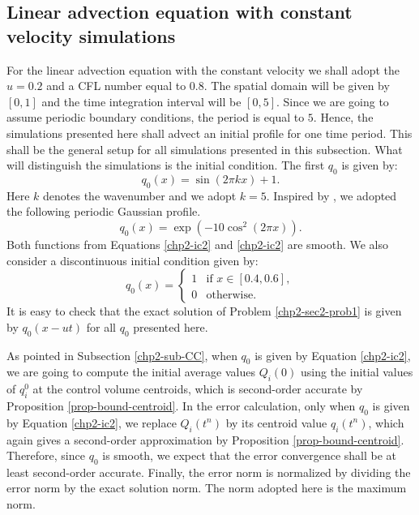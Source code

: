 \subsection{Linear advection equation with constant velocity simulations}
\label{chp2-sec-numerical-exp-1}

For the linear advection equation with the constant velocity we shall adopt the $u=0.2$ and 
a CFL number equal to $0.8$.
The spatial domain will be given by $[0,1]$ and the time integration interval will be $[0,5]$.
Since we are going to assume periodic boundary conditions, the period is equal to $5$. 
Hence, the simulations presented here shall advect an initial profile for one time period. 
This shall be the general setup for all simulations presented in this subsection. 
What will distinguish the simulations is the initial condition.
The first $q_0$ is given by:
\begin{equation}
	\label{chp2-ic1}
	q_0(x) = \sin (2\pi k x) + 1.
\end{equation}
Here $k$ denotes the wavenumber and we adopt $k=5$.
Inspired by \citet{trefethen:2000}, we adopted the following periodic Gaussian profile.
\begin{equation}
	\label{chp2-ic2}
		q_0(x) = \exp(-10\cos^2 (2\pi x)).
\end{equation}
Both functions from Equations \eqref{chp2-ic2} and \eqref{chp2-ic2} are smooth.
We also consider a discontinuous initial condition given by:
\begin{equation}
	\label{chp2-ic3}
		q_0(x) =  
  \begin{cases}
		1 & \text{if } x \in [0.4,0.6],\\
		0 & \text{otherwise}.
  \end{cases}
\end{equation}
It is easy to check that the  exact solution of Problem \ref{chp2-sec2-prob1}
is given by $q_0(x-ut)$ for all $q_0$ presented here.

As pointed in Subsection \ref{chp2-sub-CC}, when $q_0$ is given by Equation \eqref{chp2-ic2},
we are going to compute the initial average values $Q_i(0)$ using
the initial values of $q^0_i$ at the control volume centroids, which is second-order 
accurate by Proposition \ref{prop-bound-centroid}.
In the error calculation, only when $q_0$ is given by Equation \eqref{chp2-ic2},
we replace $Q_{i}(t^n)$ by its centroid value $q_{i}(t^n)$, which again gives
a second-order approximation by Proposition \ref{prop-bound-centroid}.
Therefore, since $q_0$ is smooth, we expect that the error convergence shall be at least second-order accurate.
Finally, the error norm is normalized by dividing the error norm by the exact solution norm. 
The norm adopted here is the maximum norm.

